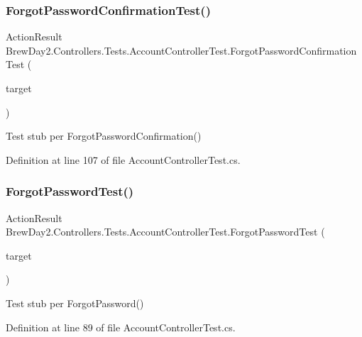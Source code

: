 \subsubsection{\texorpdfstring{Forgot\+Password\+Confirmation\+Test()}{ForgotPasswordConfirmationTest()}}
{\footnotesize\ttfamily Action\+Result Brew\+Day2.\+Controllers.\+Tests.\+Account\+Controller\+Test.\+Forgot\+Password\+Confirmation\+Test (\begin{DoxyParamCaption}\item[{\mbox{[}\+Pex\+Assume\+Under\+Test\mbox{]} \mbox{\hyperlink{class_brew_day2_1_1_controllers_1_1_account_controller}{Account\+Controller}}}]{target }\end{DoxyParamCaption})}



Test stub per Forgot\+Password\+Confirmation()



Definition at line 107 of file Account\+Controller\+Test.\+cs.

\mbox{\label{class_brew_day2_1_1_controllers_1_1_tests_1_1_account_controller_test_a188cebb2cbbc503850337b52aede6c6c}} 
\subsubsection{\texorpdfstring{Forgot\+Password\+Test()}{ForgotPasswordTest()}}
{\footnotesize\ttfamily Action\+Result Brew\+Day2.\+Controllers.\+Tests.\+Account\+Controller\+Test.\+Forgot\+Password\+Test (\begin{DoxyParamCaption}\item[{\mbox{[}\+Pex\+Assume\+Under\+Test\mbox{]} \mbox{\hyperlink{class_brew_day2_1_1_controllers_1_1_account_controller}{Account\+Controller}}}]{target }\end{DoxyParamCaption})}



Test stub per Forgot\+Password()



Definition at line 89 of file Account\+Controller\+Test.\+cs.

